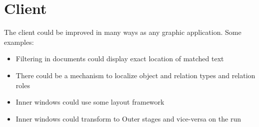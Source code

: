 \section{Client}
The \textan{} client could be improved in many ways as any graphic application.
Some examples:

\begin{itemize}
	\item Filtering in documents could display exact location of matched text
	\item There could be a mechanism to localize object and relation types and
	relation roles
	\item Inner windows could use some layout framework
	\item Inner windows could transform to Outer stages and vice-versa on the
	run
\end{itemize}
